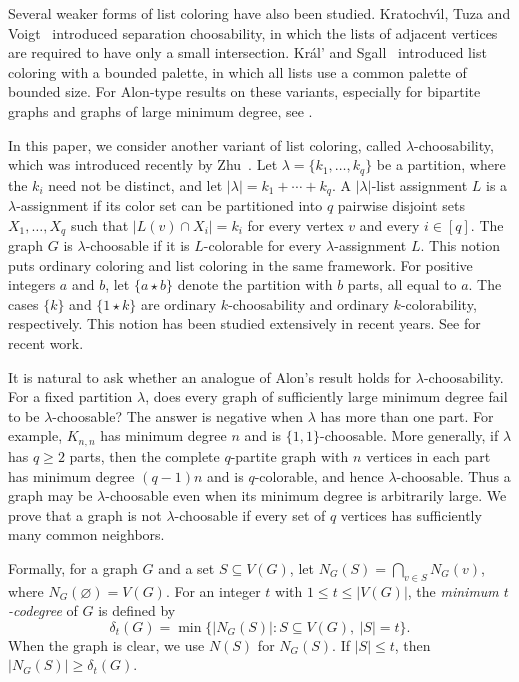 \documentclass[10pt,a4paper]{amsart}
\numberwithin{equation}{section}
\begin{document}
Several weaker forms of list coloring have also been studied.
Kratochv{\'\i}l, Tuza and Voigt~\cite{KTV1998Complexity} introduced separation
choosability, in which the lists of adjacent vertices are required to have
only a small intersection. Kr\'al' and Sgall~\cite{KralSgall2005} introduced
list coloring with a bounded palette, in which all lists use a common palette
of bounded size. For Alon-type results on these variants, especially for
bipartite graphs and graphs of large minimum degree, see
\cite{KTV1998Brooks,FKK2014,EKT2019,Kang2013,BonamyKang2017}.

In this paper, we consider another variant of list coloring, called
$\lambda$-choosability, which was introduced recently by
Zhu~\cite{Zhu2020}. Let
$\lambda = \{k_1,\ldots,k_q\}$ be a partition, where the $k_i$ need not be distinct, and let $|\lambda| = k_1 + \cdots + k_q$. A
$|\lambda|$-list assignment $L$ is a $\lambda$-assignment if its color set can
be partitioned into $q$ pairwise disjoint sets $X_1,\ldots,X_q$ such that
$|L(v) \cap X_i| = k_i$ for every vertex $v$ and every $i \in [q]$. The graph $G$ is
$\lambda$-choosable if it is $L$-colorable for every $\lambda$-assignment
$L$. This notion puts ordinary coloring and list coloring in the same
framework. For positive integers $a$ and $b$, let $\{a \star b\}$ denote the
partition with $b$ parts, all equal to $a$. The cases $\{k\}$ and
$\{1 \star k\}$ are ordinary $k$-choosability and ordinary
$k$-colorability, respectively. This notion has been studied extensively in recent years. See
\cite{GuZhu2023,ZhuZhu2021,GuJiangWoodZhu2023,ZhuZhu2025} for recent work.

It is natural to ask whether an analogue of Alon's result holds for
$\lambda$-choosability. For a fixed partition $\lambda$, does every graph of
sufficiently large minimum degree fail to be $\lambda$-choosable? The answer
is negative when $\lambda$ has more than one part. For example, $K_{n,n}$ has
minimum degree $n$ and is $\{1,1\}$-choosable. More generally, if $\lambda$
has $q \geq 2$ parts, then the complete $q$-partite graph with $n$ vertices in
each part has minimum degree $(q - 1)n$ and is $q$-colorable, and hence
$\lambda$-choosable. Thus a graph may be
$\lambda$-choosable even when its minimum degree is arbitrarily large. We
prove that a graph is not $\lambda$-choosable if every set of
$q$ vertices has sufficiently many common neighbors.

Formally, for a graph $G$ and a set $S \subseteq V(G)$, let
$N_G(S) = \bigcap_{v \in S} N_G(v)$, where
$N_G(\varnothing)=V(G)$. For an integer $t$ with
$1\leq t\leq |V(G)|$, the
\emph{minimum $t$-codegree} of $G$ is defined by
\[
 \delta_t(G)
 = \min\bigl\{|N_G(S)| : S \subseteq V(G),\ |S|=t\bigr\}.
\]
When the graph is clear, we use $N(S)$ for $N_G(S)$. If $|S| \leq t$, then
$|N_G(S)| \geq \delta_t(G)$.
\end{document}
